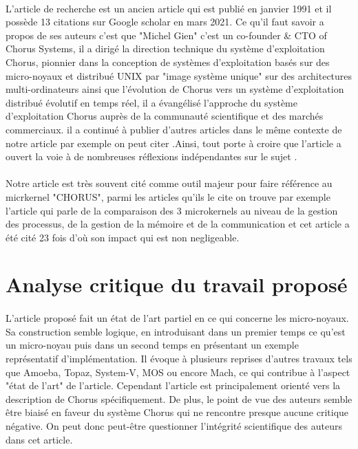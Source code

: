 \documentclass[a4paper, 12pt]{article}
\begin{document}
\paragraph{}
L’article de recherche est un  ancien article qui est publié en janvier 1991 et il possède 13 citations sur Google scholar en mars 2021.
\newline 
Ce qu'il faut savoir a propos de ses auteurs c'est que "Michel Gien" c'est un co-founder & CTO of Chorus Systems, il a dirigé la direction technique du système d'exploitation Chorus, pionnier dans la conception de systèmes d'exploitation basés sur des micro-noyaux et distribué UNIX par "image système unique" sur des architectures multi-ordinateurs ainsi que l'évolution de Chorus vers un système d'exploitation distribué évolutif en temps réel, il a évangélisé l'approche du système d'exploitation Chorus auprès de la communauté scientifique et des marchés commerciaux. il a continué à publier d'autres articles dans le même contexte de notre article par exemple on peut citer \cite{n1}.Ainsi, tout porte à croire que l'article a ouvert la voie à de nombreuses réflexions indépendantes sur le sujet . 
\paragraph{}
Notre article est très souvent cité comme outil majeur pour faire référence au micrkernel "CHORUS", parmi les articles qu'ils le cite on trouve par exemple \cite{n2} l'article qui parle de la comparaison des 3 microkernels au niveau de la gestion des processus, de la gestion de la mémoire et de la communication et cet article a été cité 23 fois d'où son impact qui est non negligeable.


 
\section{Analyse critique du travail proposé}
\paragraph{}
L'article proposé fait un état de l'art partiel en ce qui concerne les micro-noyaux. Sa construction semble logique, en introduisant dans un premier temps ce qu'est un micro-noyau puis dans un second temps en présentant un exemple représentatif d'implémentation. Il évoque à plusieurs reprises d'autres travaux tels que Amoeba, Topaz, System-V, MOS ou encore  Mach, ce qui contribue à l'aspect "état de l'art" de l'article. Cependant l'article est principalement orienté vers la description de Chorus spécifiquement. De plus, le point de vue des auteurs semble être biaisé en faveur du système Chorus qui ne rencontre presque aucune critique négative. On peut donc peut-être questionner l'intégrité scientifique des auteurs dans cet article.
\end{document}
